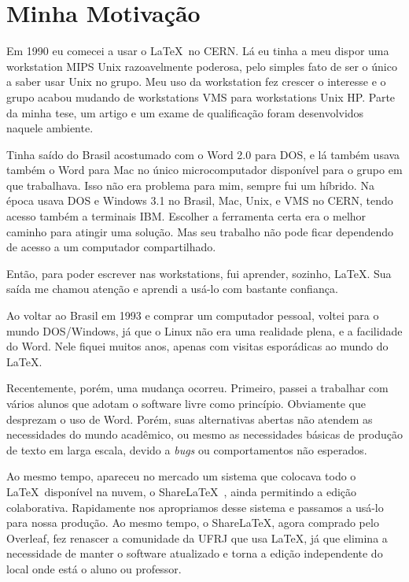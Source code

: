 \documentclass[12pt,a4paper]{book}
\begin{document}
\chapter*{Minha Motivação}

Em 1990 eu comecei a usar o \LaTeX\  no CERN. Lá eu tinha a meu dispor uma workstation MIPS Unix razoavelmente poderosa, pelo simples fato de ser o único a saber usar Unix no grupo. Meu uso da workstation fez crescer o interesse e o grupo acabou mudando de workstations VMS para workstations Unix HP. 
Parte da minha tese, um artigo e um exame de qualificação foram desenvolvidos naquele ambiente.

Tinha saído do Brasil acostumado com o Word 2.0 para DOS, e lá também usava também o Word para Mac no único microcomputador disponível para o grupo em que trabalhava. Isso não era problema para mim, sempre fui um híbrido. Na época usava DOS e Windows 3.1 no Brasil, Mac, Unix, e VMS no CERN, tendo acesso também a terminais IBM. Escolher a ferramenta certa era o melhor caminho para atingir uma solução. Mas seu trabalho não pode ficar dependendo de acesso a um computador compartilhado.

Então, para poder escrever nas workstations, fui aprender, sozinho, \LaTeX. Sua saída me chamou atenção  e aprendi a usá-lo com bastante confiança.

Ao voltar ao Brasil em 1993 e comprar um computador pessoal, voltei para o mundo DOS/Windows, já que o Linux não era uma realidade plena, e a facilidade do Word. Nele fiquei muitos anos, apenas com visitas esporádicas ao mundo do \LaTeX.

Recentemente, porém, uma mudança ocorreu. Primeiro, passei a trabalhar com vários alunos que adotam o software livre como princípio. Obviamente que desprezam o uso de Word. Porém, suas alternativas abertas não atendem as necessidades do mundo acadêmico, ou mesmo as necessidades básicas de produção de texto em larga escala, devido a \textit{bugs} ou comportamentos não esperados.

Ao mesmo tempo, apareceu no mercado um sistema que colocava todo o \LaTeX\ disponível na nuvem, o Share\LaTeX\ , ainda permitindo a edição colaborativa. Rapidamente nos apropriamos desse sistema e passamos a usá-lo para nossa produção. Ao mesmo tempo, o Share\LaTeX, agora comprado pelo Overleaf, fez renascer a comunidade da UFRJ que usa \LaTeX, já que elimina a necessidade de manter o software atualizado e torna a edição independente do local onde está o aluno ou professor.
\end{document}
